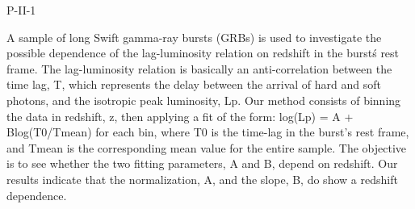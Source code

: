 P-II-1


\bigskip



\bigskip

\noindent A sample of long Swift gamma-ray bursts (GRBs) is used to investigate the possible dependence of the lag-luminosity relation on redshift in the burst\'s rest frame. The lag-luminosity relation is basically an anti-correlation between the time lag, T, which represents the delay between the arrival of hard and soft photons, and the isotropic peak luminosity, Lp. Our method consists of binning the data in redshift, z, then applying a fit of the form: log(Lp) = A + Blog(T0/Tmean) for each bin, where T0 is the time-lag in the burst’s rest frame, and Tmean is the corresponding mean value for the entire sample. The objective is to see whether the two fitting parameters, A and B, depend on redshift. Our results indicate that the normalization, A, and the slope, B, do show a redshift dependence.
